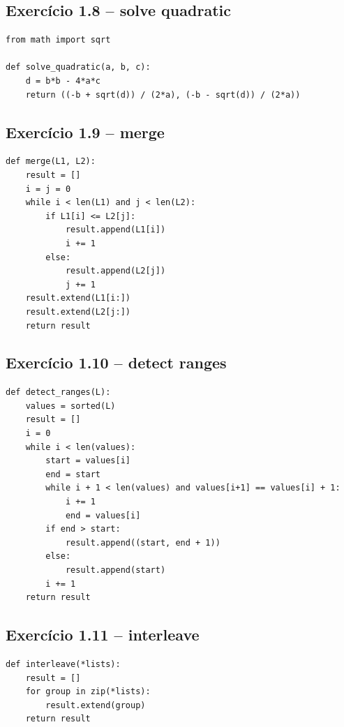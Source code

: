 \documentclass[11pt,a4paper]{article}
\begin{document}
\subsection*{Exercício 1.8 -- solve quadratic}
\begin{solucao}
\begin{lstlisting}
from math import sqrt

def solve_quadratic(a, b, c):
    d = b*b - 4*a*c
    return ((-b + sqrt(d)) / (2*a), (-b - sqrt(d)) / (2*a))
\end{lstlisting}
\end{solucao}

\subsection*{Exercício 1.9 -- merge}
\begin{solucao}
\begin{lstlisting}
def merge(L1, L2):
    result = []
    i = j = 0
    while i < len(L1) and j < len(L2):
        if L1[i] <= L2[j]:
            result.append(L1[i])
            i += 1
        else:
            result.append(L2[j])
            j += 1
    result.extend(L1[i:])
    result.extend(L2[j:])
    return result
\end{lstlisting}
\end{solucao}

\subsection*{Exercício 1.10 -- detect ranges}
\begin{solucao}
\begin{lstlisting}
def detect_ranges(L):
    values = sorted(L)
    result = []
    i = 0
    while i < len(values):
        start = values[i]
        end = start
        while i + 1 < len(values) and values[i+1] == values[i] + 1:
            i += 1
            end = values[i]
        if end > start:
            result.append((start, end + 1))
        else:
            result.append(start)
        i += 1
    return result
\end{lstlisting}
\end{solucao}

\subsection*{Exercício 1.11 -- interleave}
\begin{solucao}
\begin{lstlisting}
def interleave(*lists):
    result = []
    for group in zip(*lists):
        result.extend(group)
    return result
\end{lstlisting}
\end{solucao}
\end{document}
